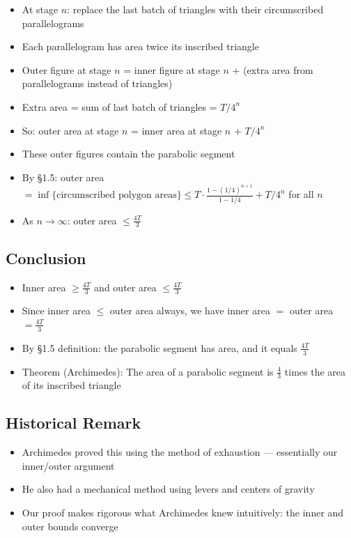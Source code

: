 \documentclass[
  10pt,
  letterpaper,
]{scrbook}
\providecommand{\tightlist}{%
  \setlength{\itemsep}{0pt}\setlength{\parskip}{0pt}}
\begin{document}
\begin{itemize}
\tightlist
\item
  At stage \(n\): replace the last batch of triangles with their
  circumscribed parallelograms
\item
  Each parallelogram has area twice its inscribed triangle
\item
  Outer figure at stage \(n\) = inner figure at stage \(n\) + (extra
  area from parallelograms instead of triangles)
\item
  Extra area = sum of last batch of triangles = \(T/4^n\)
\item
  So: outer area at stage \(n\) = inner area at stage \(n\) + \(T/4^n\)
\item
  These outer figures contain the parabolic segment
\item
  By §1.5: outer area
  \(= \inf\{\text{circumscribed polygon areas}\} \leq T \cdot \frac{1 - (1/4)^{n+1}}{1 - 1/4} + T/4^n\)
  for all \(n\)
\item
  As \(n \to \infty\): outer area \(\leq \frac{4T}{3}\)
\end{itemize}

\subsection{Conclusion}\label{conclusion}

\begin{itemize}
\tightlist
\item
  Inner area \(\geq \frac{4T}{3}\) and outer area \(\leq \frac{4T}{3}\)
\item
  Since inner area \(\leq\) outer area always, we have inner area \(=\)
  outer area \(= \frac{4T}{3}\)
\item
  By §1.5 definition: the parabolic segment has area, and it equals
  \(\frac{4T}{3}\)
\item
  Theorem (Archimedes): The area of a parabolic segment is
  \(\frac{4}{3}\) times the area of its inscribed triangle
\end{itemize}

\subsection{Historical Remark}\label{historical-remark}

\begin{itemize}
\tightlist
\item
  Archimedes proved this using the method of exhaustion --- essentially
  our inner/outer argument
\item
  He also had a mechanical method using levers and centers of gravity
\item
  Our proof makes rigorous what Archimedes knew intuitively: the inner
  and outer bounds converge
\end{itemize}
\end{document}
